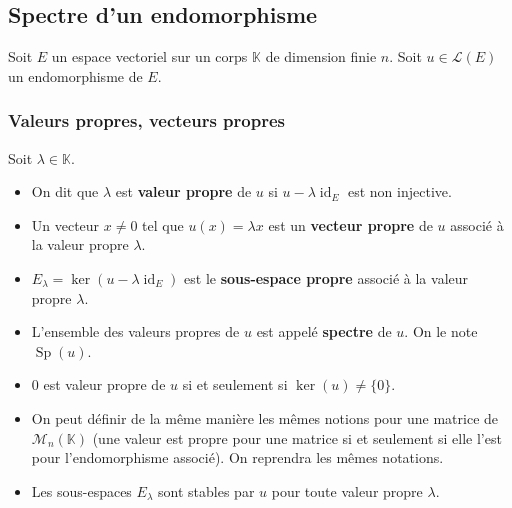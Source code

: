 




  \subsection{Spectre d'un endomorphisme}

  Soit $E$ un espace vectoriel sur un corps $\mathbb{K}$ de dimension finie $n$. Soit $u \in \mathcal{L}(E)$ un endomorphisme de $E$.

  \subsubsection{Valeurs propres, vecteurs propres}


  \begin{definition}
    Soit $\lambda \in \mathbb{K}$.
    \begin{itemize}
      \item On dit que $\lambda$ est \textbf{valeur propre} de $u$ si $u - \lambda \operatorname{id}_E$ est non injective.
      \item Un vecteur $x \neq 0$ tel que $u(x) = \lambda x$ est un \textbf{vecteur propre} de $u$ associé à la valeur propre $\lambda$.
      \item $E_\lambda = \ker(u - \lambda \operatorname{id}_E)$ est le \textbf{sous-espace propre} associé à la valeur propre $\lambda$.
      \item L'ensemble des valeurs propres de $u$ est appelé \textbf{spectre} de $u$. On le note $\operatorname{Sp}(u)$.
    \end{itemize}
  \end{definition}

  \begin{remark}
    \begin{itemize}
      \item $0$ est valeur propre de $u$ si et seulement si $\ker(u) \neq \{ 0 \}$.
      \item On peut définir de la même manière les mêmes notions pour une matrice de $\mathcal{M}_n(\mathbb{K})$ (une valeur est propre pour une matrice si et seulement si elle l'est pour l'endomorphisme associé). On reprendra les mêmes notations.
      \item Les sous-espaces $E_\lambda$ sont stables par $u$ pour toute valeur propre $\lambda$.
    \end{itemize}
  \end{remark}

